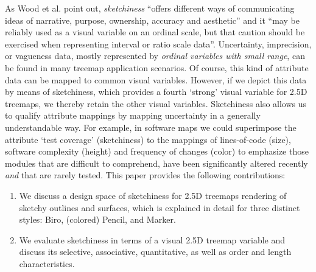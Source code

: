 As Wood et al. \cite{Wood2012} point out, \textit{sketchiness} 
\enquote{offers different ways of communicating ideas of narrative, purpose, ownership, accuracy and aesthetic} 
and it \enquote{may be reliably used as a visual variable on an ordinal scale, but that caution should be exercised when representing interval or ratio scale data}.
Uncertainty, imprecision, or vagueness data, 
mostly represented by \textit{ordinal variables with small range}, 
can be found in many treemap application scenarios.
Of course, this kind of attribute data can be mapped to common visual variables. 
However, if we depict this data by means of sketchiness, 
which provides a fourth `strong' visual variable for 2.5D treemaps, 
we thereby retain the other visual variables.
Sketchiness also allows us to qualify attribute mappings 
by mapping uncertainty in a generally understandable way. 
For example, in software maps we could superimpose the attribute `test coverage' (sketchiness) to the mappings of lines-of-code (size), software complexity (height) and frequency of changes (color) to emphasize those modules that are difficult to comprehend, have been significantly altered recently \textit{and} that are rarely tested. 
This paper provides the following contributions:
\begin{enumerate}[leftmargin=16pt]
	\item We discuss a design space of sketchiness for 2.5D treemaps \wrt rendering of sketchy outlines and surfaces, which is explained in detail for three distinct styles: Biro, (colored) Pencil, and Marker. %
	\item We evaluate sketchiness in terms of a visual 2.5D treemap variable and discuss its selective, associative, quantitative, as well as order and length characteristics.
\end{enumerate}

